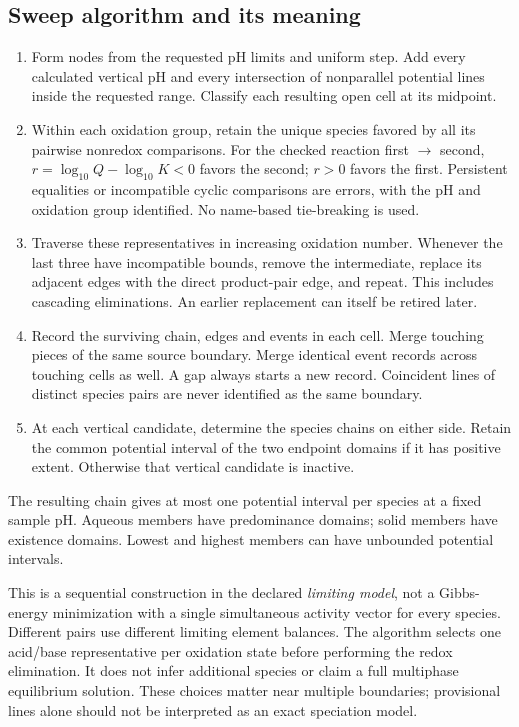 \documentclass[a4paper,11pt]{ltxdoc}
\begin{document}
\subsection{Sweep algorithm and its meaning}
\begin{enumerate}
\item Form nodes from the requested pH limits and uniform step. Add every
  calculated vertical pH and every intersection of nonparallel potential lines
  inside the requested range. Classify each resulting open cell at its midpoint.
\item Within each oxidation group, retain the unique species favored by all its
  pairwise nonredox comparisons. For the checked reaction first $\to$ second,
  $r=\log_{10}Q-\log_{10}K<0$ favors the second; $r>0$ favors the first.
  Persistent equalities or incompatible cyclic comparisons are errors, with the
  pH and oxidation group identified. No name-based tie-breaking is used.
\item Traverse these representatives in increasing oxidation number. Whenever
  the last three have incompatible bounds, remove the intermediate, replace its
  adjacent edges with the direct product-pair edge, and repeat. This includes
  cascading eliminations. An earlier replacement can itself be retired later.
\item Record the surviving chain, edges and events in each cell. Merge touching
  pieces of the same source boundary. Merge identical event records across
  touching cells as well. A gap always starts a new record. Coincident lines of
  distinct species pairs are never identified as the same boundary.
\item At each vertical candidate, determine the species chains on either side.
  Retain the common potential interval of the two endpoint domains if it has
  positive extent. Otherwise that vertical candidate is inactive.
\end{enumerate}
The resulting chain gives at most one potential interval per species at a fixed
sample pH. Aqueous members have predominance domains; solid members have existence
domains. Lowest and highest members can have unbounded potential intervals.

This is a sequential construction in the declared \emph{limiting model}, not a
Gibbs-energy minimization with a single simultaneous activity vector for every
species. Different pairs use different limiting element balances. The algorithm
selects one acid/base representative per oxidation state before performing the
redox elimination. It does not infer additional species or claim a full
multiphase equilibrium solution. These choices matter near multiple boundaries;
provisional lines alone should not be interpreted as an exact speciation model.
\end{document}
